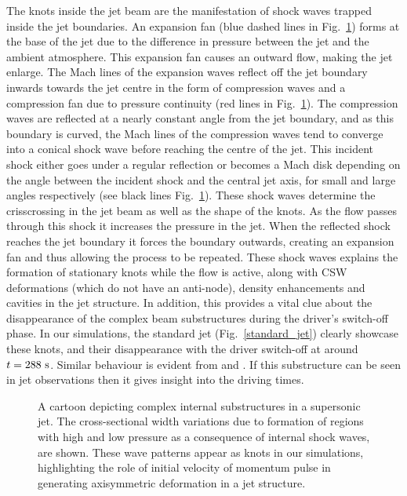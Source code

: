 %
The knots inside the jet beam are the manifestation of shock waves trapped inside the jet boundaries. An expansion fan (blue dashed lines in Fig.~\ref{cartoon_jet_waves}) forms at the base of the jet due to the difference in pressure between the jet and the ambient atmosphere. This expansion fan causes an outward flow, making the jet enlarge. The Mach lines of the expansion waves reflect off the jet boundary inwards towards the jet centre in the form of compression waves and a compression fan due to pressure continuity (red lines in Fig.~\ref{cartoon_jet_waves}). The compression waves are reflected at a nearly constant angle from the jet boundary, and as this boundary is curved, the Mach lines of the compression waves tend to converge into a conical shock wave before reaching the centre of the jet. This incident shock either goes under a regular reflection or becomes a Mach disk depending on the angle between the incident shock and the central jet axis, for small and large angles respectively (see black lines Fig.~\ref{cartoon_jet_waves}). These shock waves determine the crisscrossing in the jet beam as well as the shape of the knots. As the flow passes through this shock it increases the pressure in the jet. When the reflected shock reaches the jet boundary it forces the boundary outwards, creating an expansion fan and thus allowing the process to be repeated. \np
%
These shock waves explains the formation of stationary knots while the flow is active, along with CSW deformations (which do not have an anti-node), density enhancements and cavities in the jet structure. In addition, this provides a vital clue about the disappearance of the complex beam substructures during the driver’s switch-off phase. In our simulations, the standard jet (Fig.~\ref{standard_jet}) clearly showcase these knots, and their disappearance with the driver switch-off at around $t=288~\rm{s}$. Similar behaviour is evident from  and . If this substructure can be seen in jet observations then it gives insight into the driving times.
\begin{figure}
\captionsetup[subfigure]{labelformat=empty}
\centering
{}
\caption{A cartoon depicting complex internal substructures in a supersonic jet. The cross-sectional width variations due to formation of regions with high and low pressure as a consequence of internal shock waves, are shown. These wave patterns appear as knots in our simulations, highlighting the role of initial velocity of momentum pulse in generating axisymmetric deformation in a jet structure. }
\label{cartoon_jet_waves}
\end{figure}
